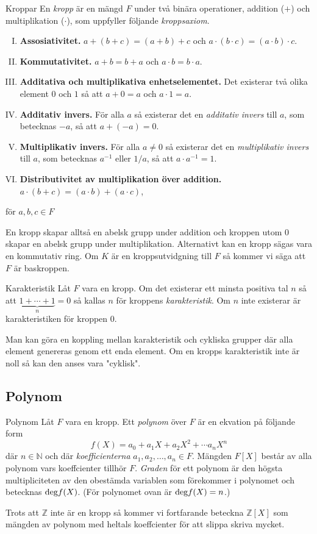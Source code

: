 \documentclass{article}
\newcommand{\grad}[0]{\textnormal{deg}}
\theoremstyle{definition}
\begin{document}
\begin{mydef}{Kroppar}{}
    En \textit{kropp} är en mängd $F$ under två binära operationer, addition ($+$) och multiplikation ($\cdot$), som uppfyller följande \textit{kroppsaxiom}.
    \begin{enumerate}[I)]
        \item \textbf{Assosiativitet.} $a + (b + c) = (a + b) + c$ och $a \cdot (b \cdot c) = (a \cdot b) \cdot c$.
        \item \textbf{Kommutativitet.} $a + b = b + a$ och $a \cdot b = b \cdot a$.
        \item \textbf{Additativa och multiplikativa enhetselementet.} Det existerar två olika element $0$ och $1$ så att $a + 0 = a$ och $a \cdot 1 = a.$
        \item \textbf{Additativ invers.} För alla $a$ så existerar det en \textit{additativ invers} till $a$, som betecknas
        $-a$, så att $a + (-a) = 0$.
        \item \textbf{Multiplikativ invers.} För alla $a \neq 0$ så existerar det en \textit{multiplikativ invers} till $a$, som betecknas $a^{-1}$ eller $1/a$, så att 
        $a \cdot a^{-1} = 1.$
        \item \textbf{Distributivitet av multiplikation över addition.} $a \cdot (b + c) = (a \cdot b) + (a \cdot c)$,
    \end{enumerate}
    för $a, b, c \in F$
\end{mydef}
En kropp skapar alltså en abelsk grupp under addition och kroppen utom $0$ skapar en abelsk grupp under multiplikation. Alternativt kan en kropp sägas
vara en kommutativ ring. Om $K$ är en kroppsutvidgning till $F$ så kommer vi säga att $F$ är baskroppen. 


\begin{mydef}{Karakteristik}{}
  Låt $F$ vara en kropp. Om det existerar ett minsta positiva tal $n$ så att $\underbrace{1 + \cdots + 1}_{n} = 0$ så kallas $n$ för kroppens \textit{karakteristik}.
  Om $n$ inte existerar är karakteristiken för kroppen $0.$
\end{mydef}
Man kan göra en koppling mellan karakteristik och cykliska grupper där alla element genereras genom ett enda element. Om en kropps karakteristik inte är noll
så kan den anses vara "cyklisk". 

\subsection{Polynom}
\begin{mydef}{Polynom}{}
  Låt $F$ vara en kropp. Ett \textit{polynom} över $F$ är en ekvation på följande form
  \[f(X) = a_0 + a_1X + a_2X^2 + \cdots a_nX^n\]
  där $n \in \mathbb{N}$ och där \textit{koefficienterna} $a_1, a_2, \ldots, a_n \in F$. 
  Mängden $F[X]$ består av alla polynom vars koeffcienter tillhör $F$. \textit{Graden} för ett polynom är den högsta multipliciteten av den obestämda variablen som förekommer i  
  polynomet och betecknas $\grad f(X)$. (För polynomet ovan är $\grad f(X) = n$.)
\end{mydef}
Trots att $\mathbb{Z}$ inte är en kropp så kommer vi fortfarande beteckna $\mathbb{Z}[X]$ som mängden av polynom med heltals koeffcienter
för att slippa skriva mycket.
\end{document}
